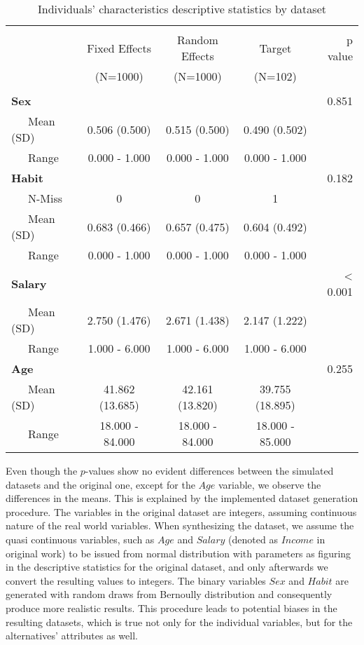 \documentclass[11pt,]{article}
\begin{document}
\begin{table}[!htbp] \centering 
  \caption{Individuals' characteristics descriptive statistics by dataset} 
  \label{tab:indivdata} 
\begin{tabular}{@{\extracolsep{5pt}}lcccr}
\\[-1.8ex]\hline 
\hline \\[-1.8ex] 
 & Fixed Effects  & Random Effects  & Target  & p value\\
 & (N=1000) & (N=1000) & (N=102) &  \\
\hline \\[-1.8ex] 
\textbf{Sex} &  &  &  & 0.851\\
~~~Mean (SD) & 0.506 (0.500) & 0.515 (0.500) & 0.490 (0.502) & \\
~~~Range & 0.000 - 1.000 & 0.000 - 1.000 & 0.000 - 1.000 & \\
\textbf{Habit} &  &  &  & 0.182\\
~~~N-Miss & 0 & 0 & 1 & \\
~~~Mean (SD) & 0.683 (0.466) & 0.657 (0.475) & 0.604 (0.492) & \\
~~~Range & 0.000 - 1.000 & 0.000 - 1.000 & 0.000 - 1.000 & \\
\textbf{Salary} &  &  &  & < 0.001\\
~~~Mean (SD) & 2.750 (1.476) & 2.671 (1.438) & 2.147 (1.222) & \\
~~~Range & 1.000 - 6.000 & 1.000 - 6.000 & 1.000 - 6.000 & \\
\textbf{Age} &  &  &  & 0.255\\
~~~Mean (SD) & 41.862 (13.685) & 42.161 (13.820) & 39.755 (18.895) & \\
~~~Range & 18.000 - 84.000 & 18.000 - 84.000 & 18.000 - 85.000 & \\
\hline
\end{tabular}
\end{table}

Even though the \(p\)-values show no evident differences between the
simulated datasets and the original one, except for the \(Age\)
variable, we observe the differences in the means. This is explained by
the implemented dataset generation procedure. The variables in the
original dataset are integers, assuming continuous nature of the real
world variables. When synthesizing the dataset, we assume the quasi
continuous variables, such as \(Age\) and \(Salary\) (denoted as
\(Income\) in original work) to be issued from normal distribution with
parameters as figuring in the descriptive statistics for the original
dataset, and only afterwards we convert the resulting values to
integers. The binary variables \(Sex\) and \(Habit\) are generated with
random draws from Bernoully distribution and consequently produce more
realistic results. This procedure leads to potential biases in the
resulting datasets, which is true not only for the individual variables,
but for the alternatives' attributes as well.
\end{document}
